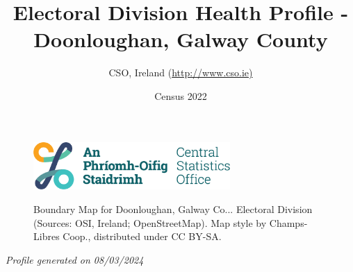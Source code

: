 \documentclass{article}
\title{Electoral Division Health Profile - Doonloughan, Galway County}
\date{Census 2022}
\author{CSO, Ireland  (\url{http://www.cso.ie)}}
\begin{document}


\begin{figure}
	\centering
\includegraphics[width =75mm]{../figures/CSO_Logo.png}
\end{figure}

\begin{figure}[h]
	\centering
	\setlength{\fboxsep}{1pt}
	\caption{\normalsize Boundary Map for Doonloughan, Galway Co... Electoral Division (Sources: OSI, Ireland; OpenStreetMap). Map style by Champs-Libres Coop., distributed under CC BY-SA.}
	\label{fig:2ae19629-1a6a-13a3-e055-000000000001}
	\end{figure}
	{\let\newpage\relax\maketitle}
	     \begin{center}
         \emph{Profile generated on 08/03/2024}
     \end{center}
\end{document}
